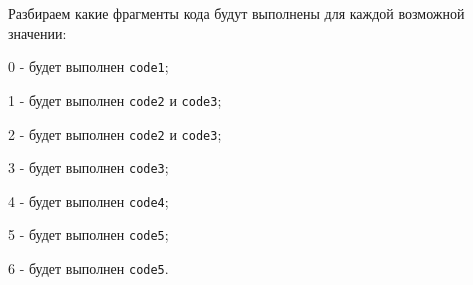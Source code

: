 Разбираем какие фрагменты кода будут выполнены для каждой возможной значении:
\begin{icItems}
	\item 0 - будет выполнен \texttt{code1};
	\item 1 - будет выполнен \texttt{code2} и \texttt{code3};
	\item 2 - будет выполнен \texttt{code2} и \texttt{code3};
	\item 3 - будет выполнен \texttt{code3};
	\item 4 - будет выполнен \texttt{code4};
	\item 5 - будет выполнен \texttt{code5};
	\item 6 - будет выполнен \texttt{code5}.
\end{icItems}

